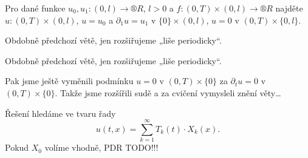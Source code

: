 \documentclass[12pt]{article}					%
\begin{document}
\begin{poznamka}
	Pro dané funkce $u_0, u_1: (0, l) \rightarrow ®R$, $l > 0$ a $f:(0, T) \times (0, l) \rightarrow ®R$ najděte $u: (0, T) \times (0, l)$, $u = u_0$ a $\partial_1 u = u_1$ v $\{0\} \times (0, l)$, $u = 0$ v $(0, T) \times \{0, l\}$.
\end{poznamka}

\begin{veta}
	Obdobně předchozí větě, jen rozšiřujeme „liše periodicky“.

	\begin{dukazin}
		Obdobně předchozí větě, jen rozšiřujeme „liše periodicky“.
	\end{dukazin}
\end{veta}

\begin{poznamka}
	Pak jsme ještě vyměnili podmínku $u = 0$ v $(0, T) \times \{0\}$ za $\partial_t u = 0$ v $(0, T) \times \{0\}$. Takže jsme rozšířili sudě a za cvičení vymysleli znění věty…
\end{poznamka}


\begin{definice}
	Řešení hledáme ve tvaru řady
	$$ u(t, x) = \sum_{k=1}^∞ T_k(t)·X_k(x). $$
	Pokud $X_0$ volíme vhodně, PDR TODO!!!
\end{definice}
\end{document}
